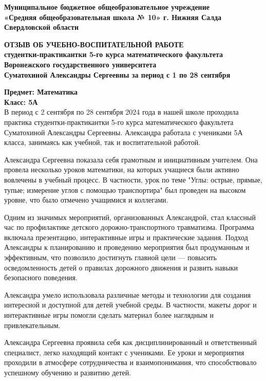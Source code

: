 \documentclass[a4paper,12pt]{article}
\begin{document}
\begin{center}
    \textbf{Муниципальное бюджетное общеобразовательное учреждение}\\
    \textbf{«Средняя общеобразовательная школа № 10» г. Нижняя Салда Свердловской области}\\
    \end{center}
\begin{center}
    \textbf{\large ОТЗЫВ ОБ УЧЕБНО-ВОСПИТАТЕЛЬНОЙ РАБОТЕ}\\
    \textbf{студентки-практикантки 5-го курса математического факультета Воронежского государственного университета }\\
    \textbf{Суматохиной Александры Сергеевны за период с 1 по 28 сентября}
    \end{center}
\vspace{10mm}

\noindent
\textbf{Предмет: Математика}\\
\textbf{Класс: 5А}\\

В период с 2 сентября по 28 сентября 2024 года в нашей школе проходила практика студентки-практикантки 5-го курса математического факультета Суматохиной Александры Сергеевны. Александра работала с учениками 5А класса, занимаясь как учебной, так и воспитательной работой.

Александра Сергеевна показала себя грамотным и инициативным учителем. Она провела несколько уроков математики, на которых учащиеся были активно вовлечены в учебный процесс. В частности, урок по теме "Углы: острые, прямые, тупые; измерение углов с помощью транспортира" был проведен на высоком уровне, что было отмечено учащимися и коллегами.

Одним из значимых мероприятий, организованных Александрой, стал классный час по профилактике детского дорожно-транспортного травматизма. Программа включала презентацию, интерактивные игры и практические задания. Подход Александры к планированию и проведению мероприятия был продуманным и эффективным, что позволило достигнуть главной цели — повысить осведомленность детей о правилах дорожного движения и развить навыки безопасного поведения.

Александра умело использовала различные методы и технологии для создания интересной и доступной для детей учебной среды. В частности, макеты дорог и интерактивные игры помогли сделать материал более наглядным и привлекательным.

Александра Сергеевна проявила себя как дисциплинированный и ответственный специалист, легко находящий контакт с учениками. Ее уроки и мероприятия проходили в атмосфере сотрудничества и взаимопонимания, что способствовало успешному обучению и развитию детей.
\end{document}
